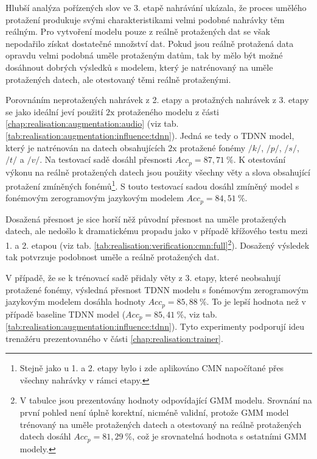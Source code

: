 Hlubší analýza pořízených slov ve 3. etapě nahrávání ukázala, že proces umělého protažení produkuje svými charakteristikami velmi podobné nahrávky těm reálným.
Pro vytvoření modelu pouze z reálně protažených dat se však nepodařilo získat dostatečné množství dat.
Pokud jsou reálně protažená data opravdu velmi podobná uměle protaženým datům, tak by mělo být možné dosáhnout dobrých výsledků s modelem, který je natrénovaný na uměle protažených datech, ale otestovaný těmi reálně protaženými.

Porovnáním neprotažených nahrávek z 2. etapy a protažných nahrávek z 3. etapy se jako ideální jeví použití $2\mathrm{x}$ protaženého modelu z části \ref{chap:realisation:augmentation:audio} (viz tab. \ref{tab:realisation:augmentation:influence:tdnn}).
Jedná se tedy o TDNN model, který je natrénován na datech obsahujících $2\mathrm{x}$ protažené fonémy $/k/$, $/p/$, $/s/$, $/t/$ a $/v/$.
Na testovací sadě dosáhl přesnosti $Acc_{p} = 87,71\ \%$.
K otestování výkonu na reálně protažených datech jsou použity všechny věty a slova obsahující protažení zmíněných fonémů\footnote{Stejně jako u 1. a 2. etapy bylo i zde aplikováno CMN napočítané přes všechny nahrávky v rámci etapy.}.
S touto testovací sadou dosáhl zmíněný model s fonémovým zerogramovým jazykovým modelem $Acc_{p} = 84,51\ \%$.

Dosažená přesnost je sice horší něž původní přesnost na uměle protažených datech, ale nedošlo k dramatickému propadu jako v případě křížového testu mezi 1. a 2. etapou (viz tab. \ref{tab:realisation:verification:cmn:full}\footnote{V tabulce jsou prezentovány hodnoty odpovídající GMM modelu. Srovnání na první pohled není úplně korektní, nicméně validní, protože GMM model trénovaný na uměle protažených datech a otestovaný na reálně protažených datech dosáhl $Acc_{p} = 81,29\ \%$, což je srovnatelná hodnota s ostatními GMM modely.}).
Dosažený výsledek tak potvrzuje podobnost uměle a reálně protažených dat.

V případě, že se k trénovací sadě přidaly věty z 3. etapy, které neobsahují protažené fonémy, výsledná přesnost TDNN modelu s fonémovým zerogramovým jazykovým modelem dosáhla hodnoty $Acc_{p} = 85,88\ \%$.
To je lepší hodnota než v případě baseline TDNN model ($Acc_{p} = 85,41\ \%$, viz tab. \ref{tab:realisation:augmentation:influence:tdnn}).
Tyto experimenty podporují ideu trenažéru prezentovaného v části \ref{chap:realisation:trainer}.

